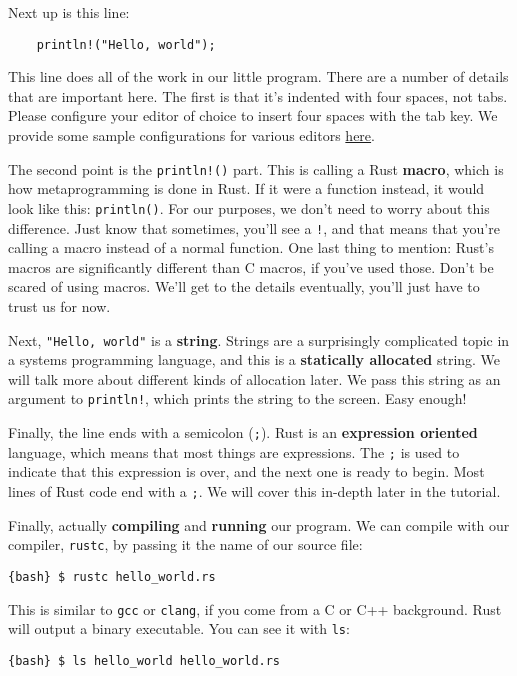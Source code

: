 \documentclass[]{article}
\begin{document}
Next up is this line:

\begin{verbatim}
    println!("Hello, world");
\end{verbatim}

This line does all of the work in our little program. There are a number
of details that are important here. The first is that it's indented with
four spaces, not tabs. Please configure your editor of choice to insert
four spaces with the tab key. We provide some sample configurations for
various editors
\href{https://github.com/rust-lang/rust/tree/master/src/etc}{here}.

The second point is the \texttt{println!()} part. This is calling a Rust
\textbf{macro}, which is how metaprogramming is done in Rust. If it were
a function instead, it would look like this: \texttt{println()}. For our
purposes, we don't need to worry about this difference. Just know that
sometimes, you'll see a \texttt{!}, and that means that you're calling a
macro instead of a normal function. One last thing to mention: Rust's
macros are significantly different than C macros, if you've used those.
Don't be scared of using macros. We'll get to the details eventually,
you'll just have to trust us for now.

Next, \texttt{"Hello, world"} is a \textbf{string}. Strings are a
surprisingly complicated topic in a systems programming language, and
this is a \textbf{statically allocated} string. We will talk more about
different kinds of allocation later. We pass this string as an argument
to \texttt{println!}, which prints the string to the screen. Easy
enough!

Finally, the line ends with a semicolon (\texttt{;}). Rust is an
\textbf{expression oriented} language, which means that most things are
expressions. The \texttt{;} is used to indicate that this expression is
over, and the next one is ready to begin. Most lines of Rust code end
with a \texttt{;}. We will cover this in-depth later in the tutorial.

Finally, actually \textbf{compiling} and \textbf{running} our program.
We can compile with our compiler, \texttt{rustc}, by passing it the name
of our source file:

\texttt{\{bash\} \$ rustc hello\_world.rs}

This is similar to \texttt{gcc} or \texttt{clang}, if you come from a C
or C++ background. Rust will output a binary executable. You can see it
with \texttt{ls}:

\texttt{\{bash\} \$ ls hello\_world  hello\_world.rs}
\end{document}

